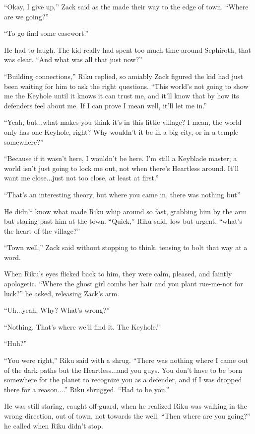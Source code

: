 ``Okay, I give up,'' Zack said as the made their way to the edge of town. ``Where are we going?''

``To go find some easewort.''

He had to laugh. The kid really had spent too much time around Sephiroth, that was clear. ``And what was all that just now?''

``Building connections,'' Riku replied, so amiably Zack figured the kid had just been waiting for him to ask the right questions. ``This world's not going to show me the Keyhole until it knows it can trust me, and it'll know that by how its defenders feel about me. If I can prove I mean well, it'll let me in.''

``Yeah, but...what makes you think it's in this little village? I mean, the world only has one Keyhole, right? Why wouldn't it be in a big city, or in a temple somewhere?''

``Because if it wasn't here, I wouldn't be here. I'm still a Keyblade master; a world isn't just going to lock me out, not when there's Heartless around. It'll want me close...just not too close, at least at first.''

``That's an interesting theory, but where you came in, there was nothing but\textemdash ''

He didn't know what made Riku whip around so fast, grabbing him by the arm but staring past him at the town. ``Quick,'' Riku said, low but urgent, ``what's the heart of the village?''

``Town well,'' Zack said without stopping to think, tensing to bolt that way at a word.

When Riku's eyes flicked back to him, they were calm, pleased, and faintly apologetic. ``Where the ghost girl combs her hair and you plant rue-me-not for luck?'' he asked, releasing Zack's arm.

``Uh...yeah. Why? What's wrong?''

``Nothing. That's where we'll find it. The Keyhole.''

``Huh?''

``You were right,'' Riku said with a shrug. ``There was nothing where I came out of the dark paths but the Heartless...and you guys. You don't have to be born somewhere for the planet to recognize you as a defender, and if I was dropped there for a reason....'' Riku shrugged. ``Had to be you.''

He was still staring, caught off-guard, when he realized Riku was walking in the wrong direction, out of town, not towards the well. ``Then where are you going?'' he called when Riku didn't stop.

